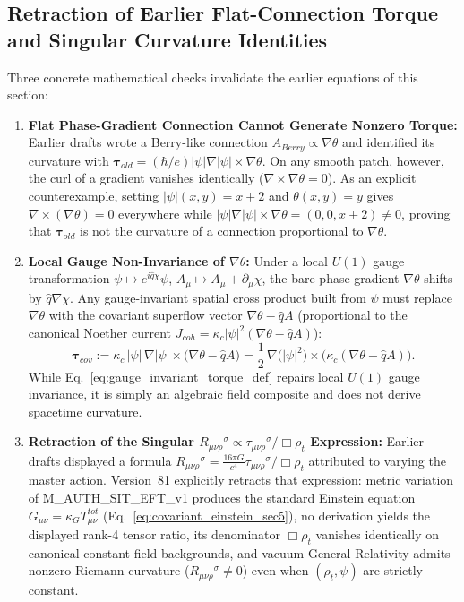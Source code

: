 \documentclass[american,11pt,letterpaper]{article}
\def\mathbf#1{#1}%
\def\mathrm#1{#1}%
\def\texttt#1{#1}%
\def\emph#1{#1}%
\begin{document}
\subsection{Retraction of Earlier Flat-Connection Torque and Singular Curvature Identities}

Three concrete mathematical checks invalidate the earlier equations of this section:
\begin{enumerate}[leftmargin=2em]
  \item \textbf{Flat Phase-Gradient Connection Cannot Generate Nonzero Torque:} Earlier drafts wrote a Berry-like connection $\mathbf{A}_{\mathrm{Berry}} \propto \nabla\theta$ and identified its curvature with $\boldsymbol{\tau}_{\mathrm{old}} = (\hbar/e)|\psi|\nabla|\psi|\times\nabla\theta$. On any smooth patch, however, the curl of a gradient vanishes identically ($\nabla\times\nabla\theta = \mathbf{0}$). As an explicit counterexample, setting $|\psi|(x,y) = x + 2$ and $\theta(x,y) = y$ gives $\nabla\times(\nabla\theta) = \mathbf{0}$ everywhere while $|\psi|\nabla|\psi|\times\nabla\theta = (0, 0, x+2) \ne \mathbf{0}$, proving that $\boldsymbol{\tau}_{\mathrm{old}}$ is \emph{not} the curvature of a connection proportional to $\nabla\theta$.
  \item \textbf{Local Gauge Non-Invariance of $\nabla\theta$:} Under a local $U(1)$ gauge transformation $\psi \mapsto e^{i\hat{q}\chi}\psi$, $A_\mu \mapsto A_\mu + \partial_\mu\chi$, the bare phase gradient $\nabla\theta$ shifts by $\hat{q}\nabla\chi$. Any gauge-invariant spatial cross product built from $\psi$ must replace $\nabla\theta$ with the covariant superflow vector $\nabla\theta - \hat{q}\mathbf{A}$ (proportional to the canonical Noether current $\mathbf{J}_{\mathrm{coh}} = \kappa_c|\psi|^2(\nabla\theta - \hat{q}\mathbf{A})$):
  \begin{equation}
  \boldsymbol{\tau}_{\mathrm{cov}} := \kappa_c\,|\psi|\,\nabla|\psi| \times \bigl(\nabla\theta - \hat{q}\mathbf{A}\bigr)
  = \frac{1}{2}\,\nabla\bigl(|\psi|^2\bigr) \times \bigl(\kappa_c(\nabla\theta - \hat{q}\mathbf{A})\bigr).
  \label{eq:gauge_invariant_torque_def}
  \end{equation}
  While Eq.~\eqref{eq:gauge_invariant_torque_def} repairs local $U(1)$ gauge invariance, it is simply an algebraic field composite and does \emph{not} derive spacetime curvature.
  \item \textbf{Retraction of the Singular $R_{\mu\nu\rho}{}^\sigma \propto \tau_{\mu\nu\rho}{}^\sigma / \Box\rho_t$ Expression:} Earlier drafts displayed a formula $R_{\mu\nu\rho}{}^\sigma = \frac{16\pi G}{c^4}\tau_{\mu\nu\rho}{}^\sigma / \Box\rho_t$ attributed to varying the master action. Version~81 explicitly retracts that expression: metric variation of \texttt{M\_AUTH\_SIT\_EFT\_v1} produces the standard Einstein equation $G_{\mu\nu} = \kappa_G T_{\mu\nu}^{\mathrm{tot}}$ (Eq.~\eqref{eq:covariant_einstein_sec5}), no derivation yields the displayed rank-4 tensor ratio, its denominator $\Box\rho_t$ vanishes identically on canonical constant-field backgrounds, and vacuum General Relativity admits nonzero Riemann curvature ($R_{\mu\nu\rho}{}^\sigma \ne 0$) even when $(\rho_t, \psi)$ are strictly constant.
\end{enumerate}
\end{document}

